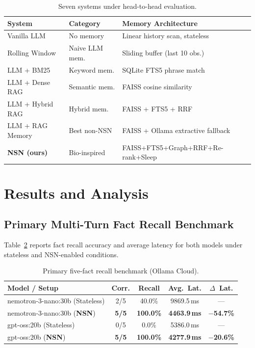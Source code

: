 \documentclass[conference]{IEEEtran}
\begin{document}
\begin{table}[!t]
\caption{Seven systems under head-to-head evaluation.}
\label{tab:systems}
\centering\scriptsize
\setlength{\tabcolsep}{4pt}
\begin{tabular}{@{}p{1.9cm}p{1.7cm}p{3.9cm}@{}}
\toprule
\textbf{System} & \textbf{Category} & \textbf{Memory Architecture} \\
\midrule
Vanilla LLM        & No memory       & Linear history scan, stateless \\
Rolling Window     & Naive LLM mem.  & Sliding buffer (last 10 obs.) \\
LLM + BM25         & Keyword mem.    & SQLite FTS5 phrase match \\
LLM + Dense RAG    & Semantic mem.   & FAISS cosine similarity \\
LLM + Hybrid RAG   & Hybrid mem.     & FAISS + FTS5 + RRF \\
LLM + RAG Memory   & Best non-NSN    & FAISS + Ollama extractive fallback \\
\textbf{NSN (ours)}& Bio-inspired    & FAISS+FTS5+Graph+RRF+Re-rank+Sleep \\
\bottomrule
\end{tabular}
\end{table}

\FloatBarrier
\section{Results and Analysis}\label{sec:results}

\subsection{Primary Multi-Turn Fact Recall Benchmark}\label{sec:results-primary}

Table~\ref{tab:primary} reports fact recall accuracy and average latency for
both models under stateless and NSN-enabled conditions.

\begin{table}[!t]
\caption{Primary five-fact recall benchmark (Ollama Cloud).}
\label{tab:primary}
\centering\footnotesize
\setlength{\tabcolsep}{4pt}
\begin{tabular}{@{}lcccc@{}}
\toprule
\textbf{Model / Setup} & \textbf{Corr.} & \textbf{Recall}
  & \textbf{Avg.~Lat.} & \textbf{$\Delta$~Lat.} \\
\midrule
nemotron-3-nano:30b (Stateless) & 2/5 & 40.0\% & 9869.5\,ms & --- \\
nemotron-3-nano:30b (\textbf{NSN}) & \textbf{5/5} & \textbf{100.0\%}
  & \textbf{4463.9\,ms} & \textbf{$-$54.7\%} \\
\midrule
gpt-oss:20b (Stateless) & 0/5 & 0.0\%  & 5386.0\,ms & --- \\
gpt-oss:20b (\textbf{NSN}) & \textbf{5/5} & \textbf{100.0\%}
  & \textbf{4277.9\,ms} & \textbf{$-$20.6\%} \\
\bottomrule
\end{tabular}
\end{table}
\end{document}
